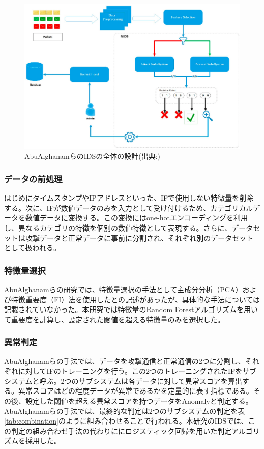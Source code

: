 \documentclass{css}
\begin{document}
\begin{figure}[ht]
    \centering
    \includegraphics[width=\linewidth]{pictures/eps/system.eps}
    \caption{AbuAlghanamらのIDSの全体の設計(出典:\cite{AbuAlghanam2023-sx})}
    \label{fig:IDS}
\end{figure}

\subsubsection{データの前処理}

はじめにタイムスタンプやIPアドレスといった、IFで使用しない特徴量を削除する。次に、IFが数値データのみを入力として受け付けるため、カテゴリカルデータを数値データに変換する。この変換にはone-hotエンコーディングを利用し、異なるカテゴリの特徴を個別の数値特徴として表現する。さらに、データセットは攻撃データと正常データに事前に分割され、それぞれ別のデータセットとして扱われる。

\subsubsection{特徴量選択}
AbuAlghanamらの研究では、特徴量選択の手法として主成分分析（PCA）および特徴重要度（FI）法を使用した\cite{AbuAlghanam2023-sx}との記述があったが、具体的な手法については記載されていなかった。本研究では特徴量のRandom Forestアルゴリズムを用いて重要度を計算し、設定された閾値を超える特徴量のみを選択した。

\subsubsection{異常判定}
AbuAlghanamらの手法では、データを攻撃通信と正常通信の2つに分割し、それぞれに対してIFのトレーニングを行う。この2つのトレーニングされたIFをサブシステムと呼ぶ。2つのサブシステムは各データに対して異常スコアを算出する。異常スコアはどの程度データが異常であるかを定量的に表す指標である。その後、設定した閾値を超える異常スコアを持つデータをAnomalyと判定する。AbuAlghanamらの手法では、最終的な判定は2つのサブシステムの判定を表\ref{tab:combination}のように組み合わせることで行われる。本研究のIDSでは、この判定の組み合わせ手法の代わりににロジスティック回帰を用いた判定アルゴリズムを採用した。
\end{document}
